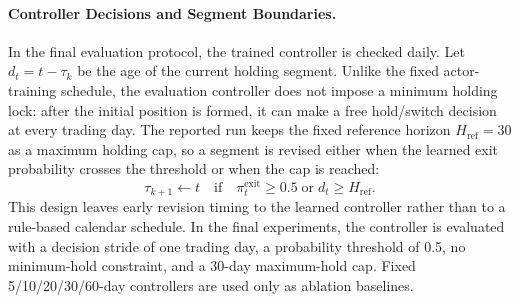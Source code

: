 \documentclass[letterpaper]{article} %
\begin{document}
\paragraph{Controller Decisions and Segment Boundaries.}
In the final evaluation protocol, the trained controller is checked daily. Let \(d_t=t-\tau_k\) be the age of the current holding segment. Unlike the fixed actor-training schedule, the evaluation controller does not impose a minimum holding lock: after the initial position is formed, it can make a free hold/switch decision at every trading day. The reported run keeps the fixed reference horizon \(H_{\mathrm{ref}}=30\) as a maximum holding cap, so a segment is revised either when the learned exit probability crosses the threshold or when the cap is reached:
\[
\tau_{k+1}\leftarrow t
\quad\text{if}\quad
\pi_t^{\mathrm{exit}}\ge 0.5
\;\text{or}\;
d_t\ge H_{\mathrm{ref}}.
\]
This design leaves early revision timing to the learned controller rather than to a rule-based calendar schedule. In the final experiments, the controller is evaluated with a decision stride of one trading day, a probability threshold of 0.5, no minimum-hold constraint, and a 30-day maximum-hold cap. Fixed 5/10/20/30/60-day controllers are used only as ablation baselines.
\end{document}
